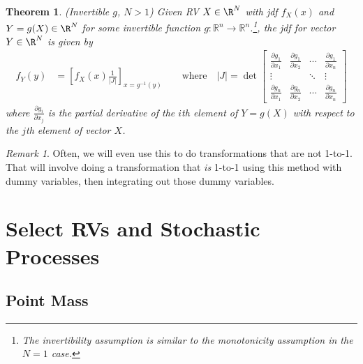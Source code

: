 \documentclass[12pt]{article}
\theoremstyle{plain}
\newtheorem{thm}{Theorem}[section]
\theoremstyle{definition}
\theoremstyle{remark}
\newtheorem*{rmk}{Remark}
\newcommand{\ra}{\rightarrow}
\newcommand{\Rn}{\mathbb{R}^n}
\begin{document}
\begin{thm}\emph{(Invertible $g$, $N>1$)}
\label{thm:transformmultivar}
Given RV $X\in\R^N$ with jdf $f_{X}(x)$ and $Y=g(X)\in\R^N$
for some invertible function $g:\Rn\ra\Rn$.\footnote{%
  The invertibility assumption is similar to the monotonicity assumption
  in the $N=1$ case.
},
the jdf for vector $Y\in\R^N$ is given by
\begin{align*}
  f_{Y}(y)
   &= \left[
      f_{X}(x)\frac{1}{\lvert J\rvert}
      \right]_{x=g^{-1}(y)}
  \qquad\text{where}\quad
  |J| =\det
   \begin{bmatrix} \frac{\partial g_1}{\partial x_1} &
      \frac{\partial g_1}{\partial x_2} & \cdots &
      \frac{\partial g_1}{\partial x_n} \\
      \vdots & & \ddots & \vdots \\
      \frac{\partial g_n}{\partial x_1} &
      \frac{\partial g_n}{\partial x_2} & \cdots &
      \frac{\partial g_n}{\partial x_n}
   \end{bmatrix}
\end{align*}
where $\frac{\partial g_i}{\partial x_j}$ is the partial derivative of
the $i$th element of $Y=g(X)$ with respect to the $j$th element of
vector $X$.
\end{thm}

\begin{rmk}
Often, we will even use this to do transformations that are not
1-to-1. That will involve doing a transformation that \emph{is}
1-to-1 using this method with dummy variables, then integrating
out those dummy variables.
\end{rmk}


\clearpage
\section{Select RVs and Stochastic Processes}

\subsection{Point Mass}
\end{document}
